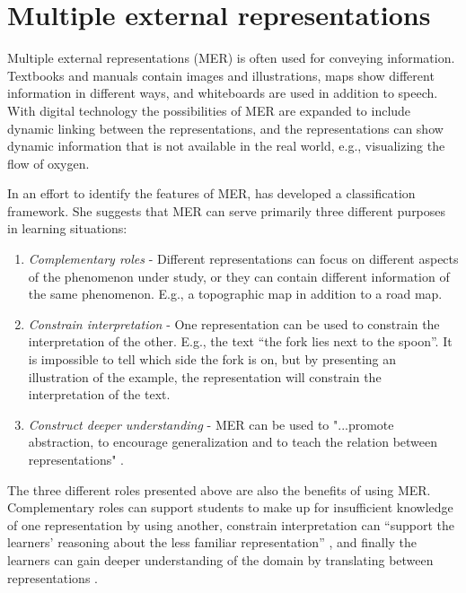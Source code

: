 
\section{Multiple external representations}
Multiple external representations (MER) is often used for conveying information. Textbooks and manuals contain images and illustrations, maps show different information in different ways, and whiteboards are used in addition to speech. With digital technology the possibilities of MER are expanded to include dynamic linking between the representations, and the representations can show dynamic information that is not available in the real world, e.g., visualizing the flow of oxygen. 

In an effort to identify the features of MER, \citet{ainsworth1999functions} has developed a classification framework. She suggests that MER can serve primarily three different purposes in learning situations:
\begin{enumerate}
\item{} \emph{Complementary roles} - Different representations can focus on different aspects of the phenomenon under study, or they can contain different information of the same phenomenon. E.g., a topographic map in addition to a road map. 
\item{} \emph{Constrain interpretation} - One representation can be used to constrain the interpretation of the other. E.g., the text “the fork lies next to the spoon”. It is impossible to tell which side the fork is on, but by presenting an illustration of the example, the representation will constrain the interpretation of the text. 
\item{} \emph{Construct deeper understanding} - MER can be used to "...promote abstraction, to encourage generalization and to teach the relation between representations" \citep{ainsworth1999functions}. 
\end{enumerate}

The three different roles presented above are also the benefits of using MER. Complementary roles can support students to make up for insufficient knowledge of one representation by using another, constrain interpretation can “support the learners’ reasoning about the less familiar representation” \citet{ainsworth1999functions}, and finally the learners can gain deeper understanding of the domain by translating between representations \citep{van2006supporting}. 

